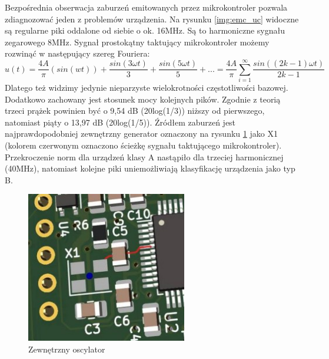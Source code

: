 Bezpośrednia obserwacja zaburzeń emitowanych przez mikrokontroler pozwala zdiagnozować jeden z problemów urządzenia. Na rysunku \ref{img:emc_uc} widoczne są regularne piki oddalone od siebie o ok. 16MHz. Są to harmoniczne sygnału zegarowego 8MHz.
\newline
Sygnał prostokątny taktujący mikrokontroler możemy rozwinąć w następujący szereg Fouriera: 
\begin{equation}
    u(t) = \frac{4A}{\pi} (sin(wt)) + \frac{sin(3\omega t)}{3} + \frac{sin(5\omega t)}{5} + ... = \frac{4A}{\pi} \sum \limits_{i=1}^{\infty} \frac{sin((2k - 1)\omega t)}{2k - 1}
\end{equation}
Dlatego też widzimy jedynie nieparzyste wielokrotności częstotliwości bazowej. Dodatkowo zachowany jest stosunek mocy kolejnych pików. Zgodnie z teorią trzeci prążek powinien być o 9,54 dB (20log(1/3)) niższy od pierwszego, natomiast piąty o 13,97 dB (20log(1/5)).
\newline
Źródłem zaburzeń jest najprawdopodobniej zewnętrzny generator oznaczony na rysunku \ref{img:emc_clock} jako X1 (kolorem czerwonym oznaczono ścieżkę sygnału taktującego mikrokontroler).
\newline
Przekroczenie norm dla urządzeń klasy A nastąpiło dla trzeciej harmonicznej (40MHz), natomiast kolejne piki uniemożliwiają klasyfikację urządzenia jako typ B.

\begin{figure}[H]
    \centering
    \includegraphics[width=7cm]{Graphics/emc_clock.jpg}
    \caption{Zewnętrzny oscylator}
    \label{img:emc_clock}
\end{figure}

